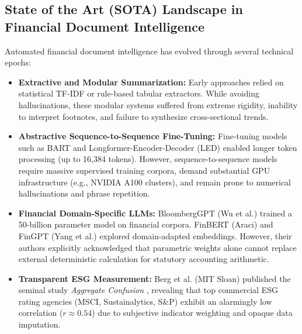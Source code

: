 \documentclass[conference]{IEEEtran}
\begin{document}
\subsection{State of the Art (SOTA) Landscape in Financial Document Intelligence}
Automated financial document intelligence has evolved through several technical epochs:
\begin{itemize}
    \item \textbf{Extractive and Modular Summarization:} Early approaches relied on statistical TF-IDF or rule-based tabular extractors. While avoiding hallucinations, these modular systems suffered from extreme rigidity, inability to interpret footnotes, and failure to synthesize cross-sectional trends.
    \item \textbf{Abstractive Sequence-to-Sequence Fine-Tuning:} Fine-tuning models such as BART \cite{lewis2020rag} and Longformer-Encoder-Decoder (LED) \cite{beltagy2020longformer} enabled longer token processing (up to 16,384 tokens). However, sequence-to-sequence models require massive supervised training corpora, demand substantial GPU infrastructure (e.g., NVIDIA A100 clusters), and remain prone to numerical hallucinations and phrase repetition.
    \item \textbf{Financial Domain-Specific LLMs:} BloombergGPT (Wu et al.) \cite{wu2023bloomberggpt} trained a 50-billion parameter model on financial corpora. FinBERT (Araci) \cite{araci2019finbert} and FinGPT (Yang et al.) \cite{yang2023fingpt} explored domain-adapted embeddings. However, their authors explicitly acknowledged that parametric weights alone cannot replace external deterministic calculation for statutory accounting arithmetic.
    \item \textbf{Transparent ESG Measurement:} Berg et al. (MIT Sloan) published the seminal study \textit{Aggregate Confusion} \cite{berg2022aggregate}, revealing that top commercial ESG rating agencies (MSCI, Sustainalytics, S\&P) exhibit an alarmingly low correlation ($r \approx 0.54$) due to subjective indicator weighting and opaque data imputation.
\end{itemize}
\end{document}
